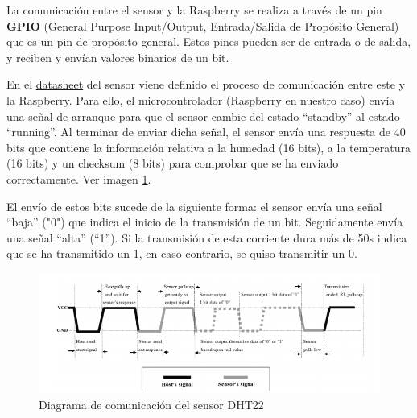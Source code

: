 La comunicación entre el sensor y la Raspberry se realiza a través de un pin \textbf{GPIO} (General Purpose Input/Output, Entrada/Salida de Propósito General) que es un pin de propósito general. Estos pines pueden ser de entrada o de salida, y reciben y envían valores binarios de un bit.

En el \href{https://cdn-shop.adafruit.com/datasheets/Digital+humidity+and+temperature+sensor+AM2302.pdf}{datasheet} del sensor viene definido el proceso de comunicación entre este y la Raspberry. Para ello, el microcontrolador (Raspberry en nuestro caso) envía una señal de arranque para que el sensor cambie del estado ``standby'' al estado ``running''. Al terminar de enviar dicha señal, el sensor envía una respuesta de 40 bits que contiene la información relativa a la humedad (16 bits), a la temperatura (16 bits) y un checksum (8 bits) para comprobar que se ha enviado correctamente. Ver imagen \ref{DHT22comunication}.

El envío de estos bits sucede de la siguiente forma: el sensor envía una señal ``baja'' ("0") que indica el inicio de la transmisión de un bit. Seguidamente envía una señal ``alta'' (``1''). Si la transmisión de esta corriente dura más de 50\mu s indica que se ha transmitido un 1, en caso contrario, se quiso transmitir un 0.

\begin{figure}[htb]
	
	\begin{center}
		\includegraphics[width=15cm]{figures/DTH22comunicationdiagram.png}
		\caption{Diagrama de comunicación del sensor DHT22}
	\end{center}
	
	\label{DHT22comunication}
\end{figure} 

